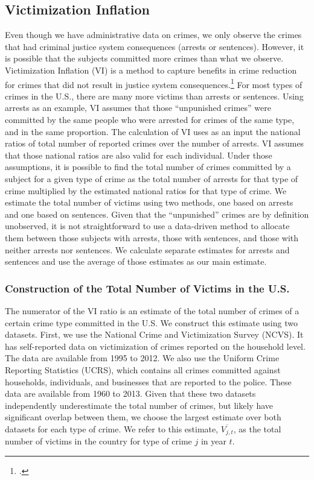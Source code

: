 \subsection{Victimization Inflation}
\label{appendix:crime-VI}
\noindent Even though we have administrative data on crimes, we only observe the crimes that had criminal justice system consequences (arrests or sentences). However, it is possible that the subjects committed more crimes than what we observe. Victimization Inflation (VI) is a method to capture benefits in crime reduction for crimes that did not result in justice system consequences.\footnote{\citet{Belfield_Nores_etal_2006_JHR,Heckman_Moon_etal_2010_RateofReturn}.} For most types of crimes in the U.S., there are many more victims than arrests or sentences. Using arrests as an example, VI assumes that those ``unpunished crimes'' were committed by the same people who were arrested for crimes of the same type, and in the same proportion. The calculation of VI uses as an input the national ratios of total number of reported crimes over the number of arrests. VI assumes that those national ratios are also valid for each individual. Under those assumptions, it is possible to find the total number of crimes committed by a subject for a given type of crime as the total number of arrests for that type of crime multiplied by the estimated national ratios for that type of crime. We estimate the total number of victims using two methods, one based on arrests and one based on sentences. Given that the ``unpunished'' crimes are by definition unobserved, it is not straightforward to use a data-driven method to allocate them between those subjects with arrests, those with sentences, and those with neither arrests nor sentences. We calculate separate estimates for arrests and sentences and use the average of those estimates as our main estimate.

\subsubsection{Construction of the Total Number of Victims in the U.S.}

\noindent The numerator of the VI ratio is an estimate of the total number of crimes of a certain crime type committed in the U.S. We construct this estimate using two datasets. First, we use the National Crime and Victimization Survey (NCVS). It has self-reported data on victimization of crimes reported on the household level. The data are available from 1995 to 2012. We also use the Uniform Crime Reporting Statistics (UCRS), which contains all crimes committed against households, individuals, and businesses that are reported to the police. These data are available from 1960 to 2013. Given that these two datasets independently underestimate the total number of crimes, but likely have significant overlap between them, we choose the largest estimate over both datasets for each type of crime. We refer to this estimate, $\overline{V_{j,t}}$, as the total number of victims in the country for type of crime $j$ in year $t$.


